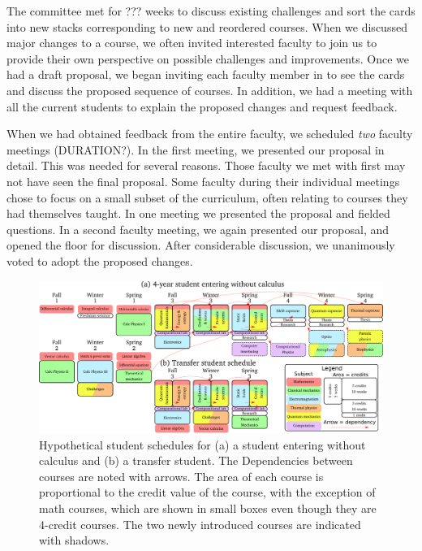 \documentclass[english,aps,pra,reprint,noshowpacs,superscriptaddress]{revtex4-1}
\begin{document}
The committee met for ??? weeks to discuss existing challenges and
sort the cards into new stacks corresponding to new and reordered
courses.  When we discussed major changes to a course, we often
invited interested faculty to join us to provide their own perspective
on possible challenges and improvements.  Once we had a draft
proposal, we began inviting each faculty member in to see the cards
and discuss the proposed sequence of courses.  In addition, we had a
meeting with all the current students to explain the proposed changes
and request feedback.

When we had obtained feedback from the entire faculty, we scheduled
\emph{two} faculty meetings (DURATION?).  In the first meeting, we
presented our proposal in detail.  This was needed for several
reasons.  Those faculty we met with first may not have seen the final
proposal.  Some faculty during their individual meetings chose to
focus on a small subset of the curriculum, often relating to courses
they had themselves taught.  In one meeting we presented the proposal
and fielded questions.  In a second faculty meeting, we again
presented our proposal, and opened the floor for discussion.  After
considerable discussion, we unanimously voted to adopt the proposed
changes.

\newcommand\mathcourse[2]{\emph{#1}}
\newcommand\noted[2]{\textbf{#1} (#2)}
\newcommand\paradigm[1]{{\sc #1} (3)}
\newcommand\capstone[1]{#1 (3)}
\newcommand\onecredit[1]{#1 (1)}
\newcommand\threecredit[1]{#1 (3)}
\newcommand\fourcredit[1]{#1 (4)}

\begin{figure}
\includegraphics[width=\textwidth]{schedule}
\caption{Hypothetical student schedules for (a) a student entering
  without calculus and (b) a transfer student.  The Dependencies
  between courses are noted with arrows.  The area of each course is
  proportional to the credit value of the course, with the exception
  of math courses, which are shown in small boxes even though they are
  4-credit courses.  The two newly introduced courses are indicated
  with shadows.\label{fig:schedule}}
\end{figure}
\end{document}
